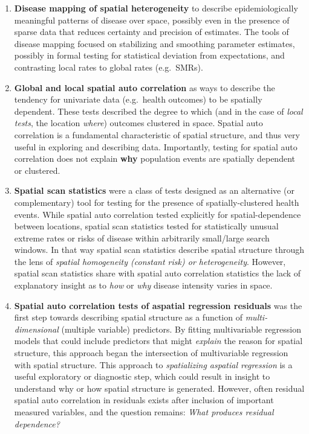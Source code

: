 \documentclass[
]{book}
\providecommand{\tightlist}{%
  \setlength{\itemsep}{0pt}\setlength{\parskip}{0pt}}
\begin{document}
\begin{enumerate}
\def\labelenumi{\arabic{enumi}.}
\tightlist
\item
  \textbf{Disease mapping of spatial heterogeneity} to describe epidemiologically meaningful patterns of disease over space, possibly even in the presence of sparse data that reduces certainty and precision of estimates. The tools of disease mapping focused on stabilizing and smoothing parameter estimates, possibly in formal testing for statistical deviation from expectations, and contrasting local rates to global rates (e.g.~SMRs).
\item
  \textbf{Global and local spatial auto correlation} as ways to describe the tendency for univariate data (e.g.~health outcomes) to be spatially dependent. These tests described the degree to which (and in the case of \emph{local tests}, the location \emph{where}) outcomes clustered in space. Spatial auto correlation is a fundamental characteristic of spatial structure, and thus very useful in exploring and describing data. Importantly, testing for spatial auto correlation does not explain \textbf{why} population events are spatially dependent or clustered.
\item
  \textbf{Spatial scan statistics} were a class of tests designed as an alternative (or complementary) tool for testing for the presence of spatially-clustered health events. While spatial auto correlation tested explicitly for spatial-dependence between locations, spatial scan statistics tested for statistically unusual extreme rates or risks of disease within arbitrarily small/large search windows. In that way spatial scan statistics describe spatial structure through the lens of \emph{spatial homogeneity (constant risk) or heterogeneity}. However, spatial scan statistics share with spatial auto correlation statistics the lack of explanatory insight as to \emph{how} or \emph{why} disease intensity varies in space.
\item
  \textbf{Spatial auto correlation tests of aspatial regression residuals} was the first step towards describing spatial structure as a function of \emph{multi-dimensional} (multiple variable) predictors. By fitting multivariable regression models that could include predictors that might \emph{explain} the reason for spatial structure, this approach began the intersection of multivariable regression with spatial structure. This approach to \emph{spatializing aspatial regression} is a useful exploratory or diagnostic step, which could result in insight to understand why or how spatial structure is generated. However, often residual spatial auto correlation in residuals exists after inclusion of important measured variables, and the question remains: \emph{What produces residual dependence?}
\end{enumerate}
\end{document}

